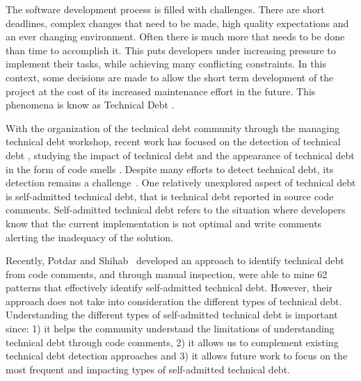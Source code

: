 The software development process is filled with challenges. There are short deadlines, complex changes that need to be made, high quality expectations and an ever changing environment. Often there is much more that needs to be done than time to accomplish it. This puts developers under increasing pressure to implement their tasks, while achieving many conflicting constraints. In this context, some decisions are made to allow the short term development of the project at the cost of its increased maintenance effort in the future. This phenomena is know as Technical Debt \cite{Cunningham1992}. 


With the organization of the technical debt community through the managing technical debt workshop, recent work has focused on the detection of technical debt \cite{Potdar2014ICSME} \cite{Zazworka2013CSE}, studying the impact of technical debt \cite{Zazworka2011MTD}
and the appearance of technical debt in the form of code smells \cite{Fontana2012MTD}. Despite many efforts to detect technical debt, its detection remains a challenge~\cite{Potdar2014ICSME}. One relatively unexplored aspect of technical debt is self-admitted technical debt, that is technical debt reported in source code comments. Self-admitted technical debt refers to the situation where developers know that the current implementation is not optimal and write comments alerting the inadequacy of the solution. 

Recently, Potdar and Shihab~\cite{Potdar2014ICSME} developed an approach to identify technical debt from code comments, and through manual inspection, were able to mine 62 patterns that effectively identify self-admitted technical debt. However, their approach does not take into consideration the different types of technical debt. Understanding the different types of self-admitted technical debt is important since: 1) it helps the community understand the limitations of understanding technical debt through code comments, 2) it allows us to complement existing technical debt detection approaches and 3) it allows future work to focus on the most frequent and impacting types of self-admitted technical debt. 

